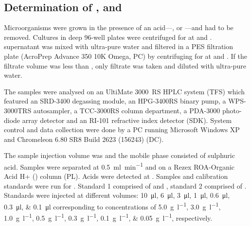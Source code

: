 \subsection{Determination of \ACET{}, \FORA{} and \LAEV{}\label{subsec-inh-acid}}
Microorganisms were grown in the presence of an acid---\acet{}, \fora{} or \laev{}---and had to be removed. Cultures in deep 96-well plates were centrifuged for  at  and .  supernatant was mixed with  ultra-pure water and filtered in a  PES filtration plate (AcroPrep Advance 350 10K Omega, PC) by centrifuging for  at  and . If the filtrate volume was less than , only  filtrate was taken and diluted with  ultra-pure water. %

The samples were analysed on an UltiMate 3000~RS HPLC system (TFS) which featured an SRD-3400 degassing module, an HPG-3400RS binary pump, a WPS-3000TRS autosampler, a TCC-3000RS column department, a PDA-3000 photo-diode array detector and an RI-101 refractive index detector (SDK). System control and data collection were done by a PC running Microsoft Windows XP and Chromeleon 6.80 SR8 Build 2623 (156243) (DC).

The sample injection volume was  and the mobile phase consisted of  sulphuric acid. Samples were separated at \SI{0.5}{\milli\litre\per\minute} and  on a Rezex ROA-Organic Acid H+ () column (PL). Acids were detected at . Samples and calibration standards were run for . Standard 1 comprised of  \acet{} and \fora{}, standard 2 comprised of  \laev{}. Standards were injected at different volumes: \SIlist{10;6;3;1;0.6;0.3;0.1}{\micro\litre} corresponding to concentrations of \SIlist{5.0;3.0;1.0;0.5;0.3;0.1;0.05}{\gram\per\litre}, respectively.

